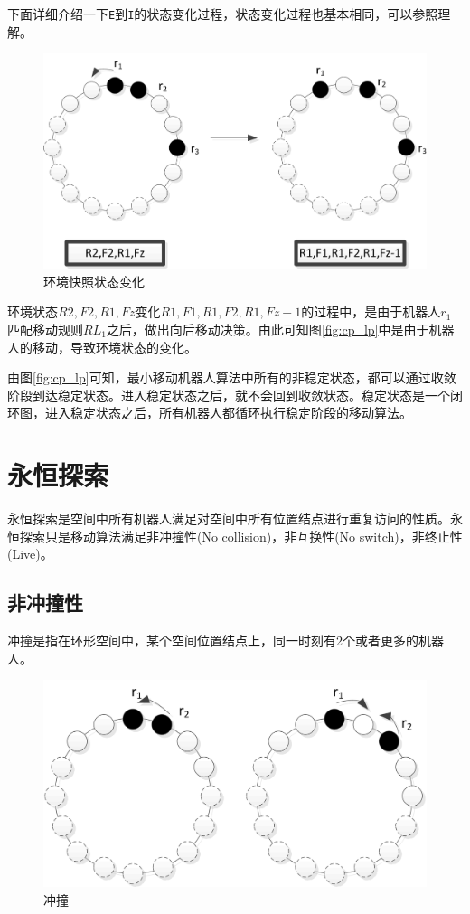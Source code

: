 下面详细介绍一下\verb|E|到\verb|I|的状态变化过程，状态变化过程也基本相同，可以参照理解。

\begin{figure}[!hbt]
	\centering
	\includegraphics[width=5 in]{fig/stateexchange.png}
	\caption{环境快照状态变化}
	\label{fig:stateexchange}
\end{figure}

环境状态$R2,F2,R1,Fz$变化$R1,F1,R1,F2,R1,Fz-1$的过程中，是由于机器人$r_1$匹配移动规则$RL_1$之后，做出向后移动决策。由此可知图\ref{fig:cp_lp}中是由于机器人的移动，导致环境状态的变化。

由图\ref{fig:cp_lp}可知，最小移动机器人算法中所有的非稳定状态，都可以通过收敛阶段到达稳定状态。进入稳定状态之后，就不会回到收敛状态。稳定状态是一个闭环图，进入稳定状态之后，所有机器人都循环执行稳定阶段的移动算法。

\section{永恒探索}
永恒探索是空间中所有机器人满足对空间中所有位置结点进行重复访问的性质。永恒探索只是移动算法满足非冲撞性(No collision)，非互换性(No switch)，非终止性(Live)。

\subsection{非冲撞性}
冲撞是指在环形空间中，某个空间位置结点上，同一时刻有2个或者更多的机器人。

\begin{figure}[!hbt]
	\centering
	\includegraphics[width=5 in]{fig/collision.png}
	\caption{冲撞}
	\label{fig:collision}
\end{figure}

